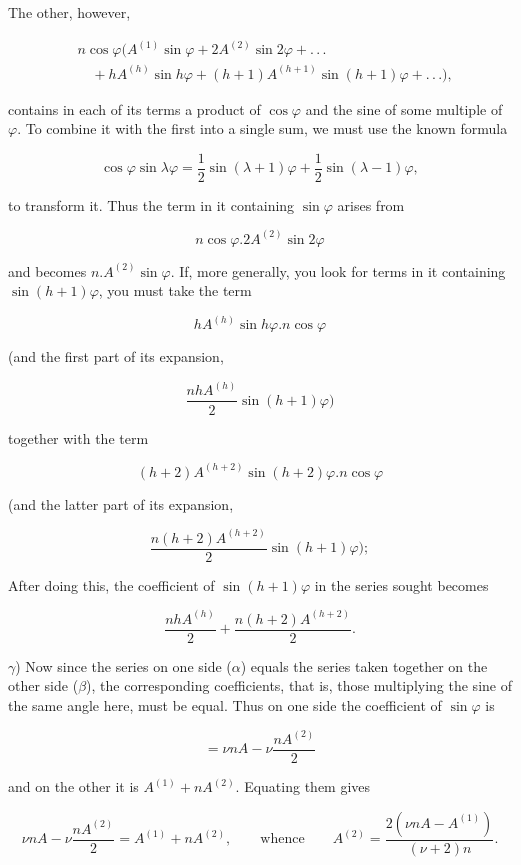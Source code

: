 \par\noindent{}%
\hspace*{\parindent}The other, however,

\[
\begin{aligned}
&n\cos\varphi\bigl(A^{(1)}\sin\varphi+2A^{(2)}\sin2\varphi+.\,.\,.\\&\quad+hA^{(h)}\sin h\varphi+(h+1)A^{(h+1)}\sin(h+1)\varphi+.\,.\,.\bigr),
\end{aligned}
\]

\noindent contains in each of its terms a product of $\cos\varphi$ and the sine of some multiple of $\varphi$. To combine it with the first into a single sum, we must use the known formula

\[
\cos\varphi\sin\lambda\varphi=\frac{1}{2}\sin(\lambda+1)\varphi+\frac{1}{2}\sin(\lambda-1)\varphi,
\]

\noindent to transform it. Thus the term in it containing $\sin\varphi$ arises from

\[
n\cos\varphi.2A^{(2)}\sin2\varphi
\]

\noindent and becomes $n.A^{(2)}\sin\varphi$. If, more generally, you look for terms in it containing $\sin(h+1)\varphi$, you must take the term

\[
hA^{(h)}\sin h\varphi.n\cos\varphi
\]

\noindent (and the first part of its expansion,

\[
\frac{nhA^{(h)}}{2}\sin(h+1)\varphi)
\]

\noindent together with the term

\[
(h+2)A^{(h+2)}\sin(h+2)\varphi.n\cos\varphi
\]

\noindent (and the latter part of its expansion,

\[
\frac{n(h+2)A^{(h+2)}}{2}\sin(h+1)\varphi);
\]

\noindent After doing this, the coefficient of $\sin(h+1)\varphi$ in the series sought becomes

\[
\frac{nhA^{(h)}}{2}+\frac{n(h+2)A^{(h+2)}}{2}.
\]

$\gamma$) Now since the series on one side ($\alpha$) equals the series taken together on the other side ($\beta$), the corresponding coefficients, that is, those multiplying the sine of the same angle here, must be equal. Thus on one side the coefficient of $\sin\varphi$ is

\[
=\nu nA-\nu\frac{nA^{(2)}}{2}
\]

\noindent and on the other it is $A^{(1)}+nA^{(2)}$. Equating them gives

\[
\nu nA-\nu\frac{nA^{(2)}}{2}=A^{(1)}+nA^{(2)},\qquad\mbox{whence}\qquad A^{(2)}=\frac{2(\nu nA-A^{(1)})}{(\nu+2)n}.
\]

